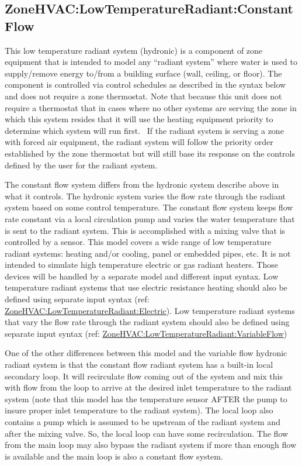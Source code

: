 \subsection{ZoneHVAC:LowTemperatureRadiant:ConstantFlow}\label{zonehvaclowtemperatureradiantconstantflow}

This low temperature radiant system (hydronic) is a component of zone equipment that is intended to model any ``radiant system'' where water is used to supply/remove energy to/from a building surface (wall, ceiling, or floor). The component is controlled via control schedules as described in the syntax below and does not require a zone thermostat. Note that because this unit does not require a thermostat that in cases where no other systems are serving the zone in which this system resides that it will use the heating equipment priority to determine which system will run first.~ If the radiant system is serving a zone with forced air equipment, the radiant system will follow the priority order established by the zone thermostat but will still base its response on the controls defined by the user for the radiant system.

The constant flow system differs from the hydronic system describe above in what it controls. The hydronic system varies the flow rate through the radiant system based on some control temperature. The constant flow system keeps flow rate constant via a local circulation pump and varies the water temperature that is sent to the radiant system. This is accomplished with a mixing valve that is controlled by a sensor. This model covers a wide range of low temperature radiant systems: heating and/or cooling, panel or embedded pipes, etc. It is not intended to simulate high temperature electric or gas radiant heaters. Those devices will be handled by a separate model and different input syntax. Low temperature radiant systems that use electric resistance heating should also be defined using separate input syntax (ref: \hyperref[zonehvaclowtemperatureradiantelectric]{ZoneHVAC:LowTemperatureRadiant:Electric}). Low temperature radiant systems that vary the flow rate through the radiant system should also be defined using separate input syntax (ref: \hyperref[zonehvaclowtemperatureradiantvariableflow]{ZoneHVAC:LowTemperatureRadiant:VariableFlow})

One of the other differences between this model and the variable flow hydronic radiant system is that the constant flow radiant system has a built-in local secondary loop. It will recirculate flow coming out of the system and mix this with flow from the loop to arrive at the desired inlet temperature to the radiant system (note that this model has the temperature sensor AFTER the pump to insure proper inlet temperature to the radiant system). The local loop also contains a pump which is assumed to be upstream of the radiant system and after the mixing valve. So, the local loop can have some recirculation. The flow from the main loop may also bypass the radiant system if more than enough flow is available and the main loop is also a constant flow system.

